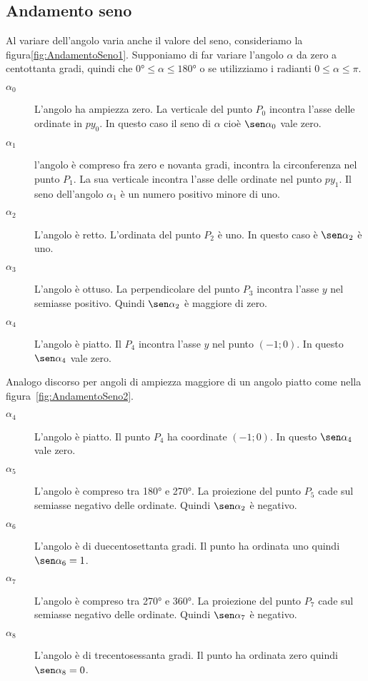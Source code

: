 \subsection{Andamento seno}
\label{subs:AndamentoSeno}
Al variare dell'angolo varia anche il valore del seno, consideriamo la figura\nobs\vref{fig:AndamentoSeno1}. Supponiamo di far variare l'angolo $\alpha$ da zero a centottanta gradi, quindi che $\ang{0}\leq\alpha\leq\ang{180}$ o se utilizziamo i radianti $0\leq\alpha\leq\pi$. 
\begin{description}
	\item[$\alpha_0$] L'angolo ha ampiezza zero. La verticale del punto $P_0$  incontra l'asse delle ordinate in $py_0$. In questo caso il seno di $\alpha$ cioè $\sen\alpha_0$ vale zero.
	\item [$\alpha_1$] l'angolo è compreso fra zero e novanta gradi, incontra la circonferenza nel punto $P_1$. La sua verticale incontra l'asse delle ordinate nel punto $py_1$. Il seno dell'angolo $\alpha_1$ è un numero positivo minore di uno.
	\item [$\alpha_2$] L'angolo  è retto. L'ordinata del punto $P_2$ è uno. In questo caso  è   $\sen\alpha_2$ è uno. 
	\item [$\alpha_3$]  L'angolo è ottuso. La perpendicolare del punto $P_3$ incontra  l'asse $y$ nel semiasse positivo. Quindi $\sen\alpha_2$ è maggiore di zero.
	\item [$\alpha_4$] L'angolo  è  piatto. Il  $P_4$ incontra l'asse $y$ nel punto $(-1;0)$. In questo  $\sen\alpha_4$ vale zero.
\end{description}
Analogo discorso per angoli di ampiezza  maggiore di un angolo  piatto come nella figura~\vref{fig:AndamentoSeno2}.
\begin{description}
	\item [$\alpha_4$] L'angolo è piatto. Il punto  $P_4$ ha coordinate  $(-1;0)$. In questo  $\sen\alpha_4$ vale zero.
	\item [$\alpha_5$] L'angolo è compreso tra \ang{180} e \ang{270}. La proiezione del punto $P_5$ cade sul semiasse negativo delle ordinate. Quindi $\sen\alpha_2$ è negativo.
	\item [$\alpha_6$] L'angolo è di duecentosettanta gradi. Il punto ha ordinata uno quindi  $\sen\alpha_6=1$.
	\item [$\alpha_7$] L'angolo è compreso tra \ang{270} e \ang{360}. La proiezione del punto $P_7$ cade sul semiasse negativo delle ordinate. Quindi $\sen\alpha_7$ è negativo.
	\item [$\alpha_8$] L'angolo è di trecentosessanta gradi. Il punto ha ordinata zero quindi  $\sen\alpha_8=0$.
\end{description}
